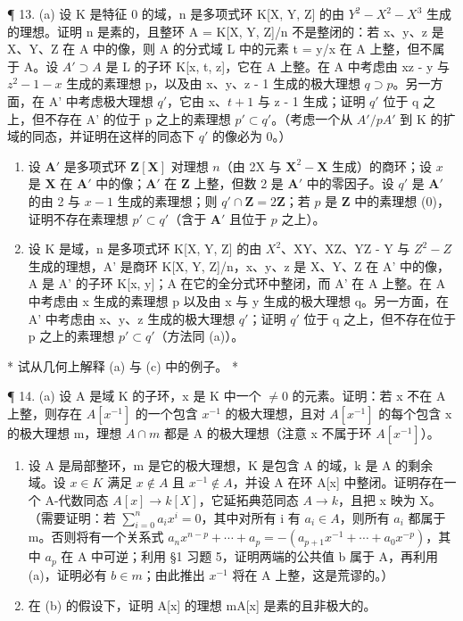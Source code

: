 ¶ 13. (a) 设 K 是特征 0 的域，n 是多项式环 K{[}X, Y, Z{]} 的由 \(Y^{2} - X^{2} - X^{3}\) 生成的理想。证明 n 是素的，且整环 A = K{[}X, Y, Z{]}/n 不是整闭的：若 x、y、z 是 X、Y、Z 在 A 中的像，则 A 的分式域 L 中的元素 t = y/x 在 A 上整，但不属于 A。设 \(A' \supset A\) 是 L 的子环 K{[}x, t, z{]}，它在 A 上整。在 A 中考虑由 xz - y 与 \(z^{2} - 1 - x\) 生成的素理想 p，以及由 x、y、z - 1 生成的极大理想 \(q \supset p\)。另一方面，在 A' 中考虑极大理想 \(q'\)，它由 x、\(t + 1\) 与 z - 1 生成；证明 \(q'\) 位于 q 之上，但不存在 A' 的位于 p 之上的素理想 \(p' \subset q'\)。（考虑一个从 \(A'/pA'\) 到 K 的扩域的同态，并证明在这样的同态下 \(q'\) 的像必为 0。）

\begin{enumerate}
\def\labelenumi{(\alph{enumi})}
\setcounter{enumi}{1}
\item
  设 \(\mathbf{A}'\) 是多项式环 \(\mathbf{Z}[\mathbf{X}]\) 对理想 \(n\)（由 2X 与 \(\mathbf{X}^2 -\mathbf{X}\) 生成）的商环；设 \(x\) 是 \(\mathbf{X}\) 在 \(\mathbf{A}'\) 中的像；\(\mathbf{A}'\) 在 \(\mathbf{Z}\) 上整，但数 2 是 \(\mathbf{A}'\) 中的零因子。设 \(q'\) 是 \(\mathbf{A}'\) 的由 2 与 \(x - 1\) 生成的素理想；则 \(q' \cap \mathbf{Z} = 2\mathbf{Z}\)；若 \(p\) 是 \(\mathbf{Z}\) 中的素理想 (0)，证明不存在素理想 \(p' \subset q'\)（含于 \(\mathbf{A}'\) 且位于 \(p\) 之上）。
\item
  设 K 是域，n 是多项式环 K{[}X, Y, Z{]} 的由 \(X^{2}\)、XY、XZ、YZ - Y 与 \(Z^{2} - Z\) 生成的理想，A' 是商环 K{[}X, Y, Z{]}/n，x、y、z 是 X、Y、Z 在 A' 中的像，A 是 A' 的子环 K{[}x, y{]}；A 在它的全分式环中整闭，而 A' 在 A 上整。在 A 中考虑由 x 生成的素理想 p 以及由 x 与 y 生成的极大理想 q。另一方面，在 A' 中考虑由 x、y、z 生成的极大理想 \(q'\)；证明 \(q'\) 位于 q 之上，但不存在位于 p 之上的素理想 \(p' \subset q'\)（方法同 (a)）。
\end{enumerate}

* 试从几何上解释 (a) 与 (c) 中的例子。 *

¶ 14. (a) 设 A 是域 K 的子环，x 是 K 中一个 \(\neq0\) 的元素。证明：若 x 不在 A 上整，则存在 \(A[x^{-1}]\) 的一个包含 \(x^{-1}\) 的极大理想，且对 \(A[x^{-1}]\) 的每个包含 x 的极大理想 m，理想 \(A\cap m\) 都是 A 的极大理想（注意 x 不属于环 \(A[x^{-1}]\)）。

\begin{enumerate}
\def\labelenumi{(\alph{enumi})}
\setcounter{enumi}{1}
\item
  设 A 是局部整环，m 是它的极大理想，K 是包含 A 的域，k 是 A 的剩余域。设 \(x \in K\) 满足 \(x \notin A\) 且 \(x^{-1} \notin A\)，并设 A 在环 A{[}x{]} 中整闭。证明存在一个 A-代数同态 \(A[x] \to k[X]\)，它延拓典范同态 \(A \to k\)，且把 x 映为 X。（需要证明：若 \(\sum_{i=0}^{n}a_{i}x^{i}=0\)，其中对所有 i 有 \(a_{i}\in A\)，则所有 \(a_{i}\) 都属于 m。否则将有一个关系式 \(a_{n}x^{n-p}+\cdots+a_{p}=-(a_{p+1}x^{-1}+\cdots+a_{0}x^{-p})\)，其中 \(a_{p}\) 在 A 中可逆；利用 §1 习题 5，证明两端的公共值 b 属于 A，再利用 (a)，证明必有 \(b\in m\)；由此推出 \(x^{-1}\) 将在 A 上整，这是荒谬的。）
\item
  在 (b) 的假设下，证明 A{[}x{]} 的理想 mA{[}x{]} 是素的且非极大的。
\end{enumerate}

